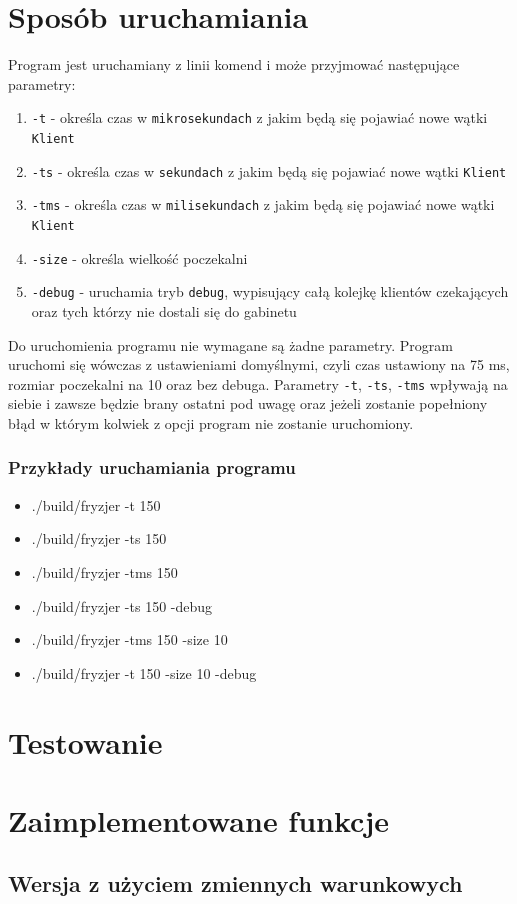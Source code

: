 \documentclass[12pt,a4paper]{article}
\begin{document}
	\section{Sposób uruchamiania}
	Program jest uruchamiany z linii komend i może przyjmować następujące parametry:
	\begin{enumerate}[label=\alph*)]
		\item \texttt{-t}  - określa czas w \texttt{mikrosekundach} z jakim będą 
				się pojawiać nowe wątki \texttt{Klient}
		\item \texttt{-ts} - określa czas w \texttt{sekundach} z jakim będą 
				się pojawiać nowe wątki \texttt{Klient}
		\item \texttt{-tms} - określa czas w \texttt{milisekundach} z jakim będą 
				się pojawiać nowe wątki \texttt{Klient}
		\item \texttt{-size} - określa wielkość poczekalni
		\item \texttt{-debug} - uruchamia tryb \texttt{debug}, wypisujący całą 
				kolejkę klientów czekających oraz tych którzy nie dostali się do 
				gabinetu 
	\end{enumerate}
	Do uruchomienia programu nie wymagane są żadne parametry. Program uruchomi 
	się wówczas z ustawieniami domyślnymi, czyli czas ustawiony na 75 ms, rozmiar 
	poczekalni na 10 oraz bez debuga. Parametry \texttt{-t}, \texttt{-ts}, \texttt{-tms} 
	wpływają na siebie i zawsze będzie brany ostatni pod uwagę oraz jeżeli zostanie 
	popełniony błąd w którym kolwiek z opcji program nie zostanie uruchomiony.
	\subsubsection*{Przykłady uruchamiania programu}
	\begin{itemize}
		\item ./build/fryzjer -t   150
		\item ./build/fryzjer -ts  150
		\item ./build/fryzjer -tms 150
		\item ./build/fryzjer -ts  150 -debug
		\item ./build/fryzjer -tms 150 -size 10
		\item ./build/fryzjer -t   150 -size 10 -debug
	\end{itemize}
 	
 	\section{Testowanie}
 	
 	\section{Zaimplementowane funkcje}
 	\subsection{Wersja z użyciem zmiennych warunkowych}

 	
\end{document}
